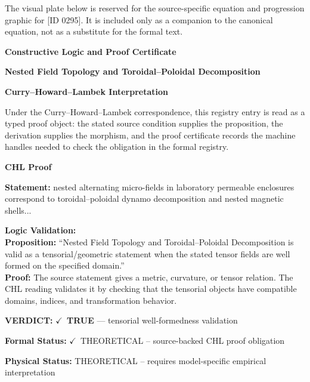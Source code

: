 \begingroup\footnotesize\sloppy
The visual plate below is reserved for the source-specific equation and progression graphic for [ID 0295]. It is included only as a companion to the canonical equation, not as a substitute for the formal text.
\par\endgroup
\ifTZPDarkEdition
{}
\fi

\clearpage
\begingroup\tzpsupportsetup
\noindent\textbf{\fontsize{10.8pt}{12.8pt}\selectfont [ID 0295] Constructive Logic and Proof Certificate}\par
\noindent\textbf{\fontsize{10pt}{12pt}\selectfont Nested Field Topology and Toroidal--Poloidal Decomposition}\par
\vspace{0.45em}
\begingroup
\footnotesize
\setlength{\parskip}{0.22em}
\setlength{\parindent}{0pt}
\noindent\textbf{Curry--Howard--Lambek Interpretation}\par
Under the Curry--Howard--Lambek correspondence, this registry entry is read as a typed proof
object: the stated source condition supplies the proposition, the derivation supplies the
morphism, and the proof certificate records the machine handles needed to check the obligation
in the formal registry.

\vspace{0.45em}
\noindent\textbf{CHL Proof}\par
\textbf{Statement:} nested alternating micro-fields in laboratory permeable enclosures correspond to
toroidal--poloidal dynamo decomposition and nested magnetic shells...

\textbf{Logic Validation:}\\
\textbf{Proposition:} ``Nested Field Topology and Toroidal--Poloidal Decomposition is valid as a
tensorial/geometric statement when the stated tensor fields are well formed on the
specified domain.''\\
\textbf{Proof:} The source statement gives a metric, curvature, or tensor relation. The CHL reading
validates it by checking that the tensorial objects have compatible domains, indices,
and transformation behavior.

\textbf{VERDICT:} \ensuremath{\checkmark}\ \textbf{TRUE} --- tensorial well-formedness validation

\textbf{Formal Status:} \ensuremath{\checkmark}\ THEORETICAL -- source-backed CHL proof obligation

\textbf{Physical Status:} THEORETICAL -- requires model-specific empirical interpretation
\par\vspace{0.45em}
\par
\ifTZPDarkEdition
{}
\fi
\endgroup
\endgroup
